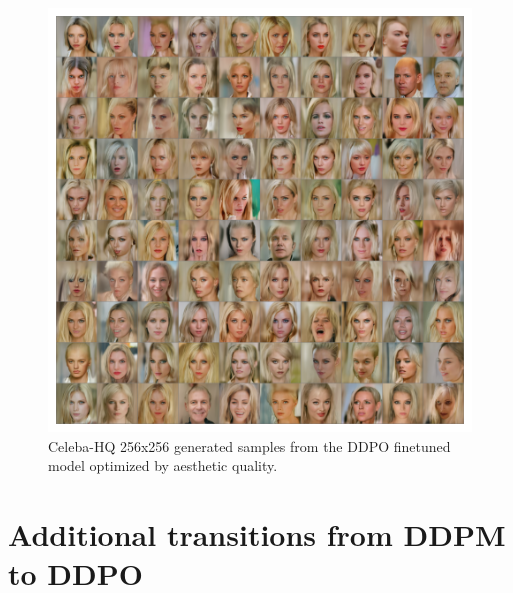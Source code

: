 \begin{appendixs}
        \begin{figure}
            \centering
            \includegraphics[scale=0.8]{img/results/ddpo-aesthetic-samples.png}
            \vspace{-4pt}  %
            \captionsetup{width=\textwidth} %
            \caption{Celeba-HQ 256x256 generated samples from the DDPO finetuned model optimized by aesthetic quality.}
            \label{fig:ddpo-aesthetic-samples}
        \end{figure}

    \newpage

    \section{Additional transitions from DDPM to DDPO}


\end{appendixs}
